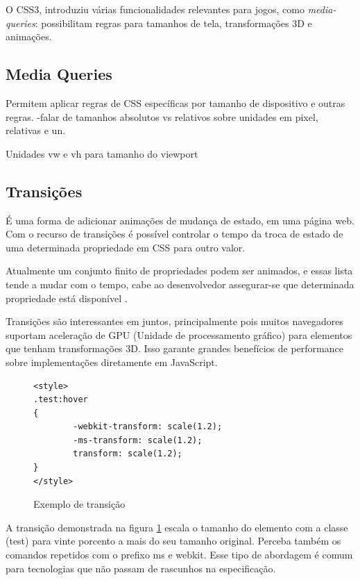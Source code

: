 \documentclass[
12pt,
a4paper,
portuges,
draft
]{report}
\begin{document}
O CSS3, introduziu várias funcionalidades
relevantes para jogos, como \textit{media-queries}: possibilitam regras para
tamanhos de tela, transformações 3D e animações.

\subsection{Media Queries}

Permitem aplicar regras de CSS específicas por tamanho de dispositivo e outras regras.
-falar de tamanhos absolutos vs relativos
sobre unidades em pixel, relativas e un.

Unidades vw e vh para tamanho do viewport

\subsection{Transições}

É uma forma de adicionar animações de mudança de estado, em uma página web.
Com o recurso de transições é possível controlar o tempo da
troca de estado de uma determinada propriedade em CSS para outro valor.

Atualmente um conjunto finito de propriedades podem ser animados, e essas
lista tende a mudar com o tempo, cabe ao desenvolvedor assegurar-se que 
determinada propriedade está disponível \autocite{mdnTransitions}.

Transições são interessantes em juntos, principalmente pois
muitos navegadores suportam aceleração de GPU (Unidade de
processamento gráfico) para elementos que tenham transformações 3D. Isso
garante grandes benefícios de performance sobre implementações diretamente
em JavaScript.

\begin{figure}
\centering
\begin{verbatim}
<style>
.test:hover
{
        -webkit-transform: scale(1.2);
        -ms-transform: scale(1.2);
        transform: scale(1.2);
}
</style>
\end{verbatim}
\caption{Exemplo de transição}
\label{fig:CSSTransition}
\end{figure}


A transição demonstrada na figura \ref{fig:CSSTransition} escala o tamanho do elemento com 
a classe (test) para vinte porcento a mais do seu tamanho original. Perceba também os comandos repetidos
com o prefixo ms e webkit. Esse tipo de  abordagem é comum para tecnologias que não passam de rascunhos
na especificação.
\end{document}

